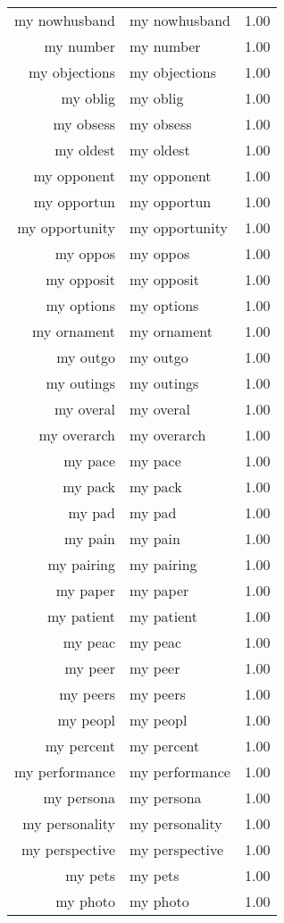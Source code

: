 \begin{table}[ht]
\begin{tabular}{rlr}
  my nowhusband & my nowhusband & 1.00 \\ 
  my number & my number & 1.00 \\ 
  my objections & my objections & 1.00 \\ 
  my oblig & my oblig & 1.00 \\ 
  my obsess & my obsess & 1.00 \\ 
  my oldest & my oldest & 1.00 \\ 
  my opponent & my opponent & 1.00 \\ 
  my opportun & my opportun & 1.00 \\ 
  my opportunity & my opportunity & 1.00 \\ 
  my oppos & my oppos & 1.00 \\ 
  my opposit & my opposit & 1.00 \\ 
  my options & my options & 1.00 \\ 
  my ornament & my ornament & 1.00 \\ 
  my outgo & my outgo & 1.00 \\ 
  my outings & my outings & 1.00 \\ 
  my overal & my overal & 1.00 \\ 
  my overarch & my overarch & 1.00 \\ 
  my pace & my pace & 1.00 \\ 
  my pack & my pack & 1.00 \\ 
  my pad & my pad & 1.00 \\ 
  my pain & my pain & 1.00 \\ 
  my pairing & my pairing & 1.00 \\ 
  my paper & my paper & 1.00 \\ 
  my patient & my patient & 1.00 \\ 
  my peac & my peac & 1.00 \\ 
  my peer & my peer & 1.00 \\ 
  my peers & my peers & 1.00 \\ 
  my peopl & my peopl & 1.00 \\ 
  my percent & my percent & 1.00 \\ 
  my performance & my performance & 1.00 \\ 
  my persona & my persona & 1.00 \\ 
  my personality & my personality & 1.00 \\ 
  my perspective & my perspective & 1.00 \\ 
  my pets & my pets & 1.00 \\ 
  my photo & my photo & 1.00 \\ 

\end{tabular}
\end{table}
